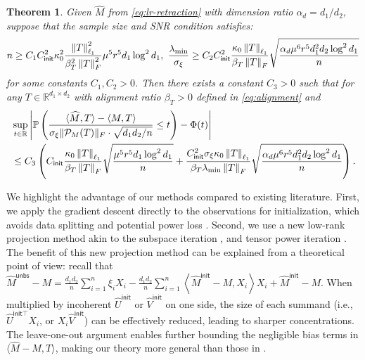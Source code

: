 \documentclass[12pt]{article}
\newcommand{\tF}{{\rm F}}
\newcommand{\norm}[1]{\left\lVert#1\right\rVert}
\newcommand{\R}{\mathbb{R}}
\newcommand{\cP}{\mathcal{P}}
\newcommand{\init}{{\mathsf{init}}}
\newtheorem{Theorem}{Theorem}
\theoremstyle{plain}
\begin{document}
\begin{sloppypar}
{\begin{Theorem}\label{thm:asymp-normal}
Given $\widehat{M}$ from \eqref{eq:lr-retraction} with dimension ratio $\alpha_d=d_1/d_2$, suppose that the sample size and SNR condition satisfies:
\begin{equation}\label{eq:condition-SNR-sample}
    n\ge  C_1 C_{\init}^2\kappa_0^2 \frac{\norm{T}_{\ell_1}^2}{\beta_T^2\norm{T}_{\tF}^2} \mu^{5}r^5 d_1\log^2 d_1, \ \frac{\lambda_{\min}}{\sigma_{\xi}} \ge  C_2 C_{\init}^2 \frac{\kappa_0\norm{T}_{\ell_1}}{\beta_T\norm{T}_\tF } \sqrt{\frac{ \alpha_{d} \mu^{6} r^5 d_1^2 d_2  \log^2 d_1 }{ n } }
\end{equation}
for some constants $C_1,C_2>0$. Then there exists a constant $C_3>0$ such that for any $T
\in \R^{d_1\times d_2}$ with alignment ratio $\beta_T>0$ defined in \eqref{eq:alignment} and
\begin{equation*}
    \begin{aligned}
        &\sup _{t \in \mathbb{R}}\left|\mathbb{P}\left(\frac{\langle \widehat{M}, T\rangle-\langle M, T\rangle}{\sigma_{\xi}\|\cP_M(T) \|_\tF \cdot \sqrt{d_1 d_2 / n}} \leq t\right)-\Phi(t)\right| \\
&\le C_3\left(  C_{\init}   \frac{\kappa_0\norm{T}_{\ell_1}}{\beta_T \norm{T}_{\tF}} \sqrt{\frac{ \mu^{5} r^5 d_1 \log^2 d_1  }{ n}} +  \frac{ C_{\init}^2\sigma_{\xi}  \kappa_0 \norm{T}_{\ell_1} }{\beta_T \lambda_{\min}  \norm{T}_\tF }\sqrt{\frac{\alpha_d \mu^{6} r^{5 } d_1^2 d_2  \log^2 d_1 }{ n } } \right). %
    \end{aligned}
\end{equation*}
\end{Theorem}

We highlight the advantage of our methods compared to existing literature. First, we apply the gradient descent directly to the observations for initialization, which avoids data splitting and potential power loss \citep{xia2021statistical}.  Second, we use a new low-rank projection method akin to the subspace iteration \citep{bathe1973solution,bathe2013subspace}, and tensor power iteration \citep{richard2014statistical}. The benefit of this new projection method can be explained from a theoretical point of view: recall that $ \widehat{M}^{\mathsf {unbs }}-M=\frac{d_1 d_2}{n} \sum_{i=1 }^n \xi_i X_i- \frac{d_1 d_2}{n} \sum_{i=1 }^n\left\langle\widehat{M}^{\mathsf{init}} - M, X_i\right\rangle X_i+\widehat{M}^{\mathsf{init}} -M$. When multiplied by  incoherent $\widehat{U}^{\mathsf{init}}$ or $\widehat{V}^{\mathsf{init}} $ on one side, the size of each summand (i.e., $\widehat{U}^{\mathsf{init}\top}X_i$, or $ X_i \widehat{V}^{\mathsf{init}}$)  can be effectively reduced, leading to sharper concentrations. The leave-one-out argument enables further bounding the negligible bias terms in $\langle \widehat{M}-M, T\rangle$, making our theory more general than those in \cite{chen2019inference}.

}
\end{sloppypar}
\end{document}
